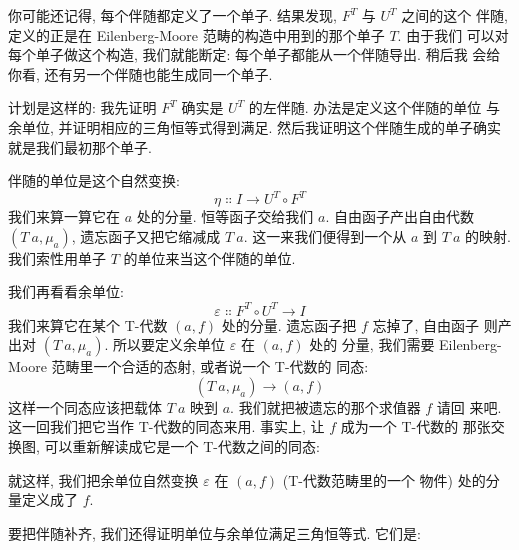 你可能还记得, 每个伴随都定义了一个单子. 结果发现, $F^T$ 与 $U^T$ 之间的这个
伴随, 定义的正是在 Eilenberg-Moore 范畴的构造中用到的那个单子 $T$. 由于我们
可以对每个单子做这个构造, 我们就能断定: 每个单子都能从一个伴随导出. 稍后我
会给你看, 还有另一个伴随也能生成同一个单子.

计划是这样的: 我先证明 $F^T$ 确实是 $U^T$ 的左伴随. 办法是定义这个伴随的单位
与余单位, 并证明相应的三角恒等式得到满足. 然后我证明这个伴随生成的单子确实
就是我们最初那个单子.

伴随的单位是这个自然变换:
\[\eta \Colon I \to U^T \circ F^T\]
我们来算一算它在 $a$ 处的分量. 恒等函子交给我们 $a$. 自由函子产出自由代数
$(T\ a, \mu_a)$, 遗忘函子又把它缩减成 $T\ a$. 这一来我们便得到一个从 $a$ 到
$T\ a$ 的映射. 我们索性用单子 $T$ 的单位来当这个伴随的单位.

我们再看看余单位:
\[\varepsilon \Colon F^T \circ U^T \to I\]
我们来算它在某个 T-代数 $(a, f)$ 处的分量. 遗忘函子把 $f$ 忘掉了, 自由函子
则产出对 $(T\ a, \mu_a)$. 所以要定义余单位 $\varepsilon$ 在 $(a, f)$ 处的
分量, 我们需要 Eilenberg-Moore 范畴里一个合适的态射, 或者说一个 T-代数的
同态:
\[(T\ a, \mu_a) \to (a, f)\]
这样一个同态应该把载体 $T\ a$ 映到 $a$. 我们就把被遗忘的那个求值器 $f$ 请回
来吧. 这一回我们把它当作 T-代数的同态来用. 事实上, 让 $f$ 成为一个 T-代数的
那张交换图, 可以重新解读成它是一个 T-代数之间的同态:

\begin{figure}[H]
  \centering
\end{figure}

\noindent
就这样, 我们把余单位自然变换 $\varepsilon$ 在 $(a, f)$ (T-代数范畴里的一个
物件) 处的分量定义成了 $f$.

要把伴随补齐, 我们还得证明单位与余单位满足三角恒等式. 它们是:

\begin{figure}[H]
  \centering
  \begin{subfigure}
    \centering
  \end{subfigure}%
  \hspace{1cm}
  \begin{subfigure}
    \centering
  \end{subfigure}
\end{figure}

